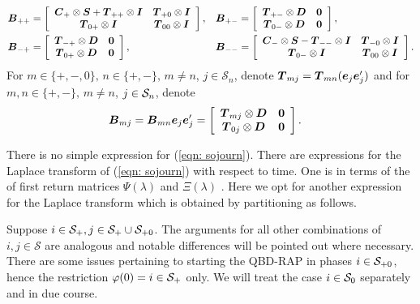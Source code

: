 \begin{align*}
\bs{B}_{++} &= \left[\begin{array}{cc} \bs{C}_+\otimes \bs{S} + \bs{T}_{++}\otimes \bs{I} & \bs T_{+0}\otimes \bs I \\ \bs T_{0+}\otimes \bs I & \bs T_{00}\otimes \bs I\end{array}\right] ,
%
&& \bs{B}_{+-} = \left[\begin{array}{cc} \bs{T}_{+-}\otimes \bs{D} & \bs 0 \\ \bs T_{0-}\otimes \bs D & \bs 0 \end{array}\right],
%
\\ \bs{B}_{-+} &=  \left[\begin{array}{cc} \bs{T}_{-+}\otimes \bs{D} & \bs 0 \\ \bs T_{0+}\otimes \bs D & \bs 0 \end{array}\right] ,
% 
&& \bs{B}_{--} = \left[\begin{array}{cc} \bs{C}_-\otimes \bs{S} - \bs{T}_{--}\otimes \bs{I} & \bs T_{-0}\otimes \bs I \\ \bs T_{0-}\otimes \bs I & \bs T_{00}\otimes \bs I\end{array}\right].
\end{align*}
For \(m\in\{+,-,0\},\,n\in\{+,-\},\,m\neq n\), \(j\in\mathcal S_n\), denote \(\boldsymbol T_{mj} = \boldsymbol T_{mn} (\boldsymbol e_j\boldsymbol e_j')\) and for \(m,n\in\{+,-\},\,m\neq n\), \(j\in\mathcal{S}_n\), denote
\begin{align}
\boldsymbol{B}_{mj} &= \boldsymbol B_{mn} \boldsymbol e_j\boldsymbol e_j'= \left[\begin{array}{cc} \boldsymbol{T}_{mj}\otimes \boldsymbol{D} & \boldsymbol 0 \\ \boldsymbol T_{0j}\otimes \boldsymbol D & \boldsymbol 0 \end{array}\right].
\end{align}

There is no simple expression for (\ref{eqn: sojourn}). There are expressions for the Laplace transform of (\ref{eqn: sojourn}) with respect to time. One is in terms of the of first return matrices \(\Psi(\lambda)\) and \(\Xi(\lambda)\) \cite{bean2009}. Here we opt for another expression for the Laplace transform which is obtained by partitioning as follows.

Suppose \(i\in\mathcal{S}_+,j\in\mathcal S_+\cup\mathcal S_{+0}\). The arguments for all other combinations of \(i,j\in\mathcal S\) are analogous and notable differences will be pointed out where necessary. There are some issues pertaining to starting the QBD-RAP in phases \(i\in\mathcal{S}_{+0}\), hence the restriction \(\varphi(0)=i\in\mathcal{S}_+\) only. We will treat the case \(i\in\mathcal{S}_0\) separately and in due course.


